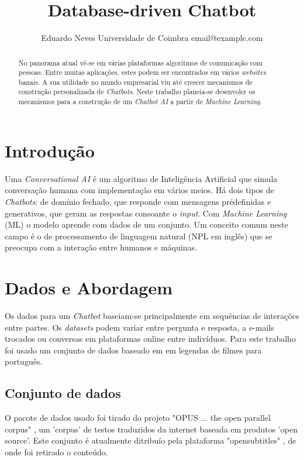 \documentclass{article}
\title{Database-driven Chatbot}
\author{
    Eduardo Neves
    \affiliations
    Universidade de Coimbra
    \emails
    email@example.com
}
\begin{document}
\maketitle

\begin{abstract}
No panorama atual vê-se em várias plataformas algoritmos de comunicação com pessoas. Entre muitas aplicações, estes podem ser encontrados em vários \textit{websites} banais. A sua utilidade no mundo empresarial viu até crescer mecanismos de construção personalizada de \textit{Chatbots}. Neste trabalho planeia-se desenvoler os mecanismos para a construção de um \textit{Chatbot AI} a partir de \textit{Machine Learning}.
\end{abstract}

\section{Introdução}
Uma \textit{Conversational AI} é um algoritmo de Inteligência Artificial que simula conversação humana com implementação em vários meios. Há dois tipos de \textit{Chatbots}: de domínio fechado, que responde com mensagens prédefinidas e generativos, que geram as respostas consoante o \textit{input}. Com \textit{Machine Learning} (ML) o modelo aprende com dados de um conjunto. Um conceito comum neste campo é o de processamento de linguagem natural (NPL em inglês) que se preocupa com a interação entre humanos e máquinas. 


\section{Dados e Abordagem}
Os dados para um \textit{Chatbot} baseiam-se principalmente em sequências de interações entre partes. Os \textit{datasets} podem variar entre pergunta e resposta, a e-mails trocados ou conversas em plataformas online entre indivíduos. Para este trabalho foi usado um conjunto de dados baseado em em legendas de filmes para português.

\subsection{Conjunto de dados}
O pacote de dados usado foi tirado do projeto "OPUS ... the open parallel corpus" \cite{opus}, um 'corpus' de testos traduzidos da internet baseada em produtos 'open source'. Este conjunto é atualmente ditribuío pela plataforma "opensubtitles" \cite{opensubtitles} \cite{lison-tiedemann-2016-opensubtitles2016}, de onde foi retirado o conteúdo.
\end{document}
